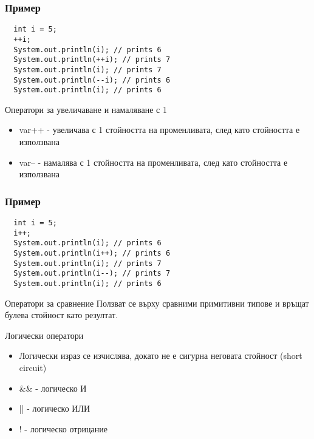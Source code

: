 \documentclass{beamer}
\begin{document}
\begin{frame}[fragile]
  \frametitle{Пример}
\begin{lstlisting}
  int i = 5;
  ++i;
  System.out.println(i); // prints 6
  System.out.println(++i); // prints 7
  System.out.println(i); // prints 7
  System.out.println(--i); // prints 6
  System.out.println(i); // prints 6
\end{lstlisting}
\end{frame}


\begin{frame}{Оператори за увеличаване и намаляване с 1}
  \begin{itemize}
  \item var++ - увеличава с 1 стойността на
    променливата, след като стойността е
    използвана
  \item var-- - намалява с 1 стойността на
    променливата, след като стойността е
    използвана
  \end{itemize}
\end{frame}

\begin{frame}[fragile]
  \frametitle{Пример}
\begin{lstlisting}
  int i = 5;
  i++;
  System.out.println(i); // prints 6
  System.out.println(i++); // prints 6
  System.out.println(i); // prints 7
  System.out.println(i--); // prints 7
  System.out.println(i); // prints 6
\end{lstlisting}
\end{frame}


\begin{frame}{Оператори за сравнение}
  Ползват се върху сравними примитивни
  типове и връщат булева стойност като резултат.
  
%
\end{frame}


\begin{frame}{Логически оператори}
  \begin{itemize}
  \item   Логически израз се изчислява, докато
    не е сигурна неговата стойност (short
    circuit)
  \item \&\& - логическо И
  \item || - логическо ИЛИ
  \item ! - логическо отрицание

  \end{itemize}
\end{frame}
\end{document}
